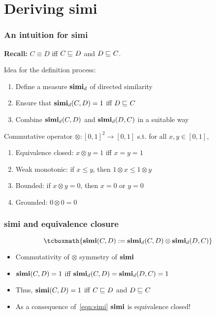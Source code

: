 \documentclass[smaller, dvipsnames]{beamer}
\begin{document}
\section{Deriving simi}

\begin{frame}
  \frametitle{An intuition for simi}
  \textbf{Recall:} \(C \equiv D\) iff \(C \sqsubseteq_{\mathcal{}} D\) and \(D \sqsubseteq_{\mathcal{}} C\).

  \onslide<+->  
  \alert{Idea} for the definition process:
  \begin{enumerate}[<+->]
    \item Define a measure \(\operatorname{\mathbf{simi}}_d\) of \alert{directed similarity}
    \item Ensure that \(\operatorname{\mathbf{simi}}_d(C,D) = 1\) iff \(D \sqsubseteq_{\mathcal{}} C\)
    \item Combine \(\operatorname{\mathbf{simi}}_d(C,D)\) and \(\operatorname{\mathbf{simi}}_d(D,C)\) in a suitable way
  \end{enumerate}
  \onslide<+->
  \begin{definition}
    Commutative operator
    \(\otimes \colon%
    {[0,1]}^2 \to [0,1]\) s.t. for all
    \(x, y \in [0,1]\),
    \begin{enumerate}%
      \item\label{fu:1} \alert{Equivalence closed}:
      \(x \otimes y = 1\) iff \(x = y = 1\)
      \item\label{fu:2} \alert{Weak monotonic}:
      if \(x \le y\), then
      \(1 \otimes x \le 1 \otimes y\) 
      \item\label{fu:3} \alert{Bounded}:
      if \(x \otimes y = 0\), then
      \(x = 0\) or \(y = 0\)
      \item\label{fu:4} \alert{Grounded}:
      \(0 \otimes 0 = 0\)
    \end{enumerate}
  \end{definition}
\end{frame}

\begin{frame}
  \frametitle{simi and equivalence closure}
  \begin{equation}
    \label{eqn:simi}
    \tcboxmath{\simi(C,D) := \simi_d(C,D) \otimes \simi_d(D,C)}
  \end{equation}
  \onslide<+->
  \begin{itemize}[<+->]
    \item Commutativity of \(\otimes\) \textrightarrow{} \alert{symmetry} of \(\operatorname{\mathbf{simi}}\)
    \item \(\operatorname{\mathbf{simi}}(C,D) = 1\) iff
          \(\operatorname{\mathbf{simi}}_d(C,D) = \operatorname{\mathbf{simi}}_d(D,C) = 1\)
    \item Thus, \(\operatorname{\mathbf{simi}}(C,D) = 1\) iff \(C \sqsubseteq_{\mathcal{}} D\) and \(D \sqsubseteq_{\mathcal{}} C\)
    \item As a consequence of~\eqref{eqn:simi} \(\operatorname{\mathbf{simi}}\) is \alert{equivalence closed}! 
  \end{itemize}
\end{frame}
\end{document}
